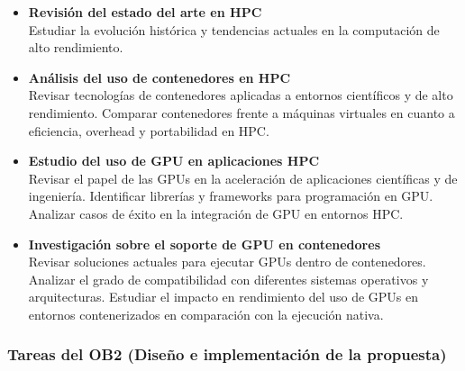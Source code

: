 \begin{itemize}
    \item \textbf{Revisión del estado del arte en HPC} \\
          Estudiar la evolución histórica y tendencias actuales en la computación de alto rendimiento.

    \item \textbf{Análisis del uso de contenedores en HPC} \\
          Revisar tecnologías de contenedores aplicadas a entornos científicos y de alto rendimiento. Comparar contenedores frente a máquinas virtuales en cuanto a eficiencia, overhead y portabilidad en HPC.

    \item \textbf{Estudio del uso de GPU en aplicaciones HPC} \\
          Revisar el papel de las GPUs en la aceleración de aplicaciones científicas y de ingeniería. Identificar librerías y frameworks para programación en GPU. Analizar casos de éxito en la integración de GPU en entornos HPC.

    \item \textbf{Investigación sobre el soporte de GPU en contenedores} \\
          Revisar soluciones actuales para ejecutar GPUs dentro de contenedores. Analizar el grado de compatibilidad con diferentes sistemas operativos y arquitecturas. Estudiar el impacto en rendimiento del uso de GPUs en entornos contenerizados en comparación con la ejecución nativa.
\end{itemize}

\subsubsection{Tareas del OB2 (Diseño e implementación de la propuesta)}\label{subsubsec:tareas_ob2}

